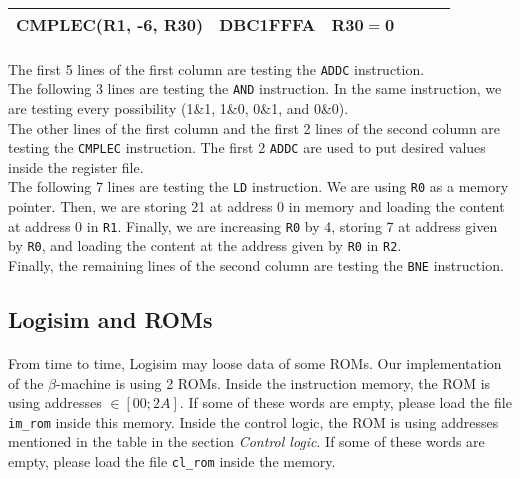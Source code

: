 \documentclass[a4paper, 10pt, oneside]{article}
\begin{document}
{\begin{tabular}{|l|l|l|l|l|l|}
CMPLEC(R1, -6, R30)                        & DBC1FFFA                                  & R30$=$0                              &                                  &                                  &                                                                                         \\ \hline
\end{tabular}
}
\paragraph{}The first 5 lines of the first column are testing the \texttt{ADDC} instruction.\\
The following 3 lines are testing the \texttt{AND} instruction. In the same instruction, we are testing every possibility (1\&1, 1\&0, 0\&1, and 0\&0).\\
The other lines of the first column and the first 2 lines of the second column are testing the \texttt{CMPLEC} instruction. The first 2 \texttt{ADDC} are used to put desired values inside the register file.\\
The following 7 lines are testing the \texttt{LD} instruction. We are using \texttt{R0} as a memory pointer. Then, we are storing 21 at address 0 in memory and loading the content at address 0 in \texttt{R1}. Finally, we are increasing \texttt{R0} by 4, storing 7 at address given by \texttt{R0}, and loading the content at the address given by \texttt{R0} in \texttt{R2}.\\
Finally, the remaining lines of the second column are testing the \texttt{BNE} instruction.

\subsection*{Logisim and ROMs}
\paragraph{}From time to time, Logisim may loose data of some ROMs. Our implementation of the $\beta$-machine is using 2 ROMs. Inside the instruction memory, the ROM is using addresses $\in \left[00; 2A\right]$. If some of these words are empty, please load the file \texttt{im\_rom} inside this memory. Inside the control logic, the ROM is using addresses mentioned in the table in the section \textit{Control logic}. If some of these words are empty, please load the file \texttt{cl\_rom} inside the memory.
\end{document}
